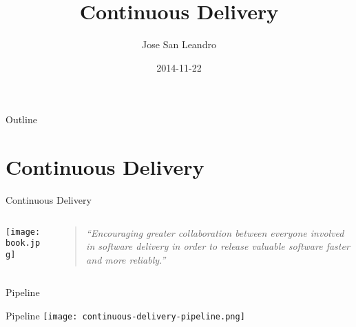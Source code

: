 \documentclass[presentation]{beamer}
\author{Jose San Leandro}
\date{2014-11-22}
\title{Continuous Delivery}
\begin{document}
\maketitle
\begin{frame}{Outline}
\tableofcontents
\end{frame}


\section{Continuous Delivery}
\label{sec-1}

{
\begin{frame}[label=sec-1-1]{Continuous Delivery}

\begin{columns}
\begin{column}{0.4\textwidth}
\texttt{[image: book.jpg]}
\end{column}

\begin{column}{0.6\textwidth}
\begin{quotation} %

\textit{``Encouraging greater collaboration between everyone involved in software delivery in order to release valuable software faster and more reliably.''}
\end{quotation}
\end{column}
\end{columns}
\end{frame}} %

\begin{frame}[label=sec-1-2]{Pipeline}
\begin{block}{Pipeline}
\texttt{[image: continuous-delivery-pipeline.png]}
\end{block}
\end{frame}
\end{document}
